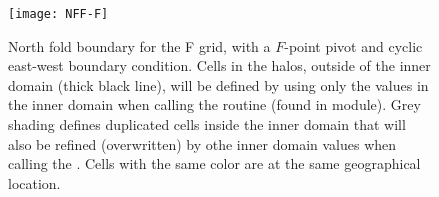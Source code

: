 \documentclass[../main/NEMO_manual]{subfiles}
\begin{document}
\begin{figure}[t]
  \centering
  \texttt{[image: NFF-F]}
  \caption{
    North fold boundary for the F grid, with a $F$-point pivot and cyclic east-west boundary condition.
    Cells in the halos, outside of the inner domain (thick black line), will be defined by using only the values in the inner domain when calling the  routine (found in  module). Grey shading defines duplicated cells inside the inner domain that will also be refined (overwritten) by othe inner domain values when calling the .
    Cells with the same color are at the same geographical location.}
  \label{fig:NFF-F}
\end{figure}


\subinc{}
\end{document}
